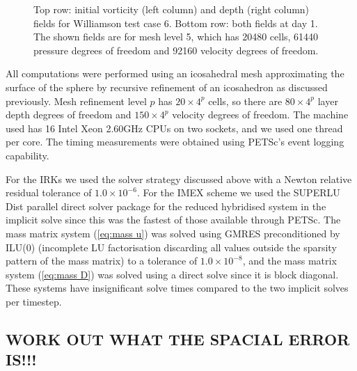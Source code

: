\documentclass[a4paper, 12pt]{article}
\begin{document}
\begin{figure}
\begin{tabular}{cc}
 \end{tabular}\vspace{-10pt}
  \caption{Top row: initial vorticity (left column) and depth (right
    column) fields for Williamson test case 6. Bottom row: both fields
    at day 1. The shown fields are for mesh level 5, which has 20480
    cells, 61440 pressure degrees of freedom and 92160 velocity
    degrees of freedom.}
 \label{tc6_fields}
\end{figure}

All computations were performed using an icosahedral mesh
approximating the surface of the sphere by recursive refinement of an
icosahedron as discussed previously. Mesh refinement level $p$ has
$20\times 4^p$ cells, so there are $80\times 4^p$ layer depth degrees
of freedom and $150\times 4^p$ velocity degrees of freedom. The
machine used has 16 Intel Xeon 2.60GHz CPUs on two sockets, and we
used one thread per core. The timing measurements were obtained using
PETSc's event logging capability.

For the IRKs we used the solver strategy discussed above with a Newton
relative residual tolerance of $1.0\times 10^{-6}$. For the IMEX
scheme we used the SUPERLU Dist parallel direct solver package
\citep{li2023newly,li2003superlu_dist} for the reduced hybridised
system in the implicit solve since this was the fastest of those
available through PETSc. The mass matrix system (\ref{eq:mass u}) was
solved using GMRES preconditioned by ILU(0) (incomplete LU
factorisation discarding all values outside the sparsity pattern of
the mass matrix) to a tolerance of $1.0\times 10^{-8}$, and the mass
matrix system (\ref{eq:mass D}) was solved using a direct solve since
it is block diagonal. These systems have insignificant solve times
compared to the two implicit solves per timestep.

\subsection{WORK OUT WHAT THE SPACIAL ERROR IS!!!}
\end{document}
